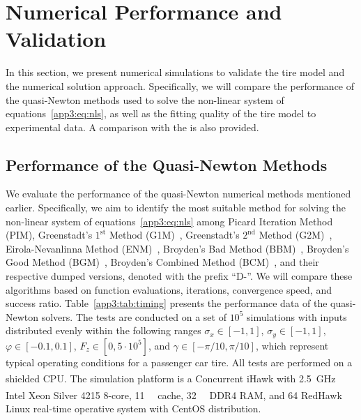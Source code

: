 
\section{Numerical Performance and Validation}
\label{app3:sec:numerical_experiments}

In this section, we present numerical simulations to validate the tire model and the numerical solution approach. Specifically, we will compare the performance of the quasi-Newton methods used to solve the non-linear system of equations~\eqref{app3:eq:nls}, as well as the fitting quality of the tire model to experimental data. A comparison with the \MagicFormulae{} is also provided.

\subsection{Performance of the Quasi-Newton Methods}

We evaluate the performance of the quasi-Newton numerical methods mentioned earlier. Specifically, we aim to identify the most suitable method for solving the non-linear system of equations~\eqref{app3:eq:nls} among Picard Iteration Method (PIM), Greenstadt's $1^\text{st}$ Method (G1M)~\cite{spedicato1978some}, Greenstadt's $2^\text{nd}$ Method (G2M)~\cite{spedicato1978some}, Eirola-Nevanlinna Method (ENM)~\cite{eirola1989accelerating}, Broyden's Bad Method (BBM)~\cite{broyden1965class},
Broyden's Good Method (BGM)~\cite{broyden1965class}, Broyden's Combined Method (BCM)~\cite{martinez1982sobre}, and their respective dumped versions, denoted with the prefix ``D-''. We will compare these algorithms based on function evaluations, iterations, convergence speed, and success ratio. Table~\ref{app3:tab:timing} presents the performance data of the quasi-Newton solvers. The tests are conducted on a set of $10^5$ simulations with inputs distributed evenly within the following ranges $\sigma_x\in[-1,1]$, $\sigma_y\in[-1,1]$, $\varphi\in[-0.1,0.1]$, $F_z\in[0,5\cdot10^5]$, and $\gamma \in [-\pi/10, \pi/10]$, which represent typical operating conditions for a passenger car tire. All tests are performed on a shielded CPU. The simulation platform is a Concurrent\textsuperscript{\textregistered} iHawk\textsuperscript{\texttrademark} with \SI{2.5}{\giga\hertz} Intel\textsuperscript{\textregistered} Xeon\textsuperscript{\textregistered} Silver 4215 8-core, \SI{11}{\mega\byte} cache, \SI{32}{\giga\byte} DDR4 \ac{RAM}, and \SI{64}{\bit} RedHawk\textsuperscript{\texttrademark} Linux real-time operative system with CentOS distribution.

